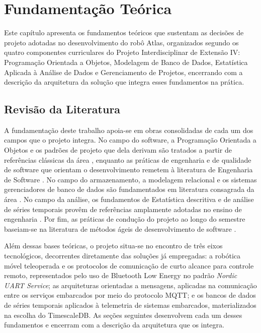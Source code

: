 \chapter{Fundamentação Teórica}\label{chap:FundamentacaoTeorica}

Este capítulo apresenta os fundamentos teóricos que sustentam as decisões de projeto adotadas no desenvolvimento do robô Atlas, organizados segundo os quatro componentes curriculares do Projeto Interdisciplinar de Extensão IV: Programação Orientada a Objetos, Modelagem de Banco de Dados, Estatística Aplicada à Análise de Dados e Gerenciamento de Projetos, encerrando com a descrição da arquitetura da solução que integra esses fundamentos na prática.

\section{Revisão da Literatura} \label{sec:revisao_literatura}
A fundamentação deste trabalho apoia-se em obras consolidadas de cada um dos campos que o projeto integra. No campo do software, a Programação Orientada a Objetos e os padrões de projeto que dela derivam são tratados a partir de referências clássicas da área \cite{deitel2016,gamma2000}, enquanto as práticas de engenharia e de qualidade de software que orientam o desenvolvimento remetem à literatura de Engenharia de Software \cite{sommerville2018}. No campo do armazenamento, a modelagem relacional e os sistemas gerenciadores de banco de dados são fundamentados em literatura consagrada da área \cite{elmasri2011}. No campo da análise, os fundamentos de Estatística descritiva e de análise de séries temporais provêm de referências amplamente adotadas no ensino de engenharia \cite{bussab2017,morettin2018}. Por fim, as práticas de condução do projeto ao longo do semestre baseiam-se na literatura de métodos ágeis de desenvolvimento de software \cite{prikladnicki2014}.

Além dessas bases teóricas, o projeto situa-se no encontro de três eixos tecnológicos, decorrentes diretamente das soluções já empregadas: a robótica móvel teleoperada e os protocolos de comunicação de curto alcance para controle remoto, representados pelo uso de Bluetooth Low Energy no padrão \textit{Nordic UART Service}; as arquiteturas orientadas a mensagens, aplicadas na comunicação entre os serviços embarcados por meio do protocolo MQTT; e os bancos de dados de séries temporais aplicados à telemetria de sistemas embarcados, materializados na escolha do TimescaleDB. As seções seguintes desenvolvem cada um desses fundamentos e encerram com a descrição da arquitetura que os integra.

